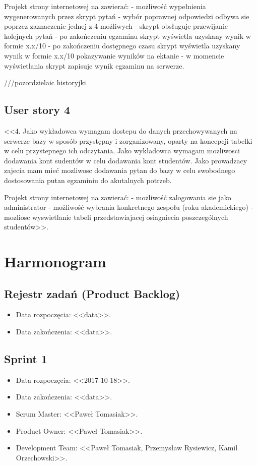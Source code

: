 \documentclass[a4paper]{article}
\begin{document}
Projekt strony internetowej na zawierać:
- możliwość wypełnienia wygenerowanych przez skrypt pytań
- wybór poprawnej odpowiedzi odbywa sie poprzez zaznaczenie jednej z 4 możliwych
- skrypt obsługuje przewijanie kolejnych pytań
- po zakończeniu egzaminu skrypt wyświetla uzyskany wynik w formie x.x/10
- po zakończeniu dostępnego czasu skrypt wyświetla uzyskany wynik w formie x.x/10        pokazywanie wyników na ektanie
- w momencie wyświetlania skrypt zapisuje wynik egzaminu na serwerze.


///pozordzielaic historyjki
\subsection*{User story 4}
<<4.
Jako wykładowca wymagam dostepu do danych przechowywanych na serwerze bazy w sposób przystępny i zorganizowany, oparty na koncepcji tabelki w celu przystepnego ich odczytania. Jako wykładowca wymagam mozliwosci dodawania kont sudentów w celu dodawania kont studentów. Jako prowadzacy zajecia mam mieć mozliwosc dodawania pytan do bazy w celu swobodnego dostosowania putan egzaminiu do akutalnych potrzeb. 

Projekt strony internetowej na zawierać:
- możliwość zalogowania sie jako administrator
- możliwość wybrania konkretnego zespołu (roku akademickiego)
- mozliosc wyswietlanie tabeli przedstawiajacej osiagniecia poszczególnych studentów>>.

\section{Harmonogram}

\subsection{Rejestr zadań (Product Backlog)}

\begin{itemize}
\item Data rozpoczęcia: <<data>>.
\item  Data zakończenia: <<data>>.
\end{itemize}

\subsection{Sprint 1}

\begin{itemize}
\item Data rozpoczęcia: <<2017-10-18>>.
\item Data zakończenia: <<data>>.
\item Scrum Master: <<Paweł Tomasiak>>.
\item Product Owner: <<Paweł Tomasiak>>.
\item Development Team: <<Paweł Tomasiak, Przemysław Rysiewicz, Kamil Orzechowski>>.
\end{itemize}
\end{document}

